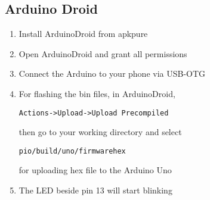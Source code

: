 \subsection{Arduino Droid}
\begin{enumerate}[label=\arabic*.,ref=\theenumi]
\item Install ArduinoDroid from apkpure
\item Open ArduinoDroid and grant all permissions
\item Connect the Arduino to your phone via USB-OTG
\item For flashing the bin files, in ArduinoDroid,
\begin{lstlisting}
Actions->Upload->Upload Precompiled
\end{lstlisting}
then go to your working directory and select
\begin{lstlisting}
pio/build/uno/firmwarehex
\end{lstlisting}
for uploading hex file to the Arduino Uno
\item The LED beside pin 13 will start
blinking
\end{enumerate}




